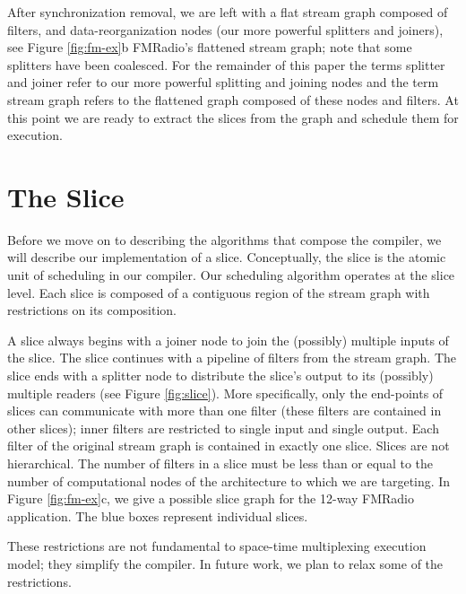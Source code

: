 After synchronization removal, we are left with a flat stream graph
composed of filters, and data-reorganization nodes (our more powerful
splitters and joiners), see Figure \ref{fig:fm-ex}b FMRadio's
flattened stream graph; note that some splitters have been
coalesced. For the remainder of this paper the terms splitter and
joiner refer to our more powerful splitting and joining nodes and the
term stream graph refers to the flattened graph composed of these
nodes and filters.  At this point we are ready to extract the slices
from the graph and schedule them for execution.



\section{The Slice}
Before we move on to describing the algorithms that compose the
compiler, we will describe our implementation of a
slice. Conceptually, the slice is the atomic unit of scheduling in our
compiler.  Our scheduling algorithm operates at the slice level.
Each slice is composed of a contiguous region of the stream
graph with restrictions on its composition. 

A slice always begins with a joiner node to join the (possibly)
multiple inputs of the slice.  The slice continues with a pipeline of
filters from the stream graph.  The slice ends with a splitter node to
distribute the slice's output to its (possibly) multiple readers (see
Figure \ref{fig:slice}).  More specifically, only the end-points of
slices can communicate with more than one filter (these filters are
contained in other slices); inner filters are restricted to single
input and single output.  Each filter of the original stream graph is
contained in exactly one slice.  Slices are not hierarchical.  The
number of filters in a slice must be less than or equal to the number
of computational nodes of the architecture to which we are targeting.
In Figure \ref{fig:fm-ex}c, we give a possible slice graph for the
12-way FMRadio application.  The blue boxes represent individual
slices.

These restrictions are not fundamental to space-time multiplexing
execution model; they simplify the compiler.  In future work, we plan
to relax some of the restrictions.

